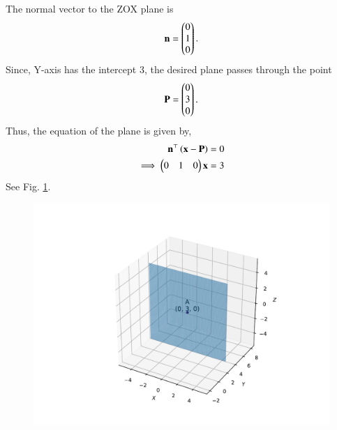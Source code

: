The normal vector to the ZOX plane is
\begin{align} 
\mathbf{n} = \begin{pmatrix}0\\1\\0\end{pmatrix}.
\end{align}
Since, Y-axis has the intercept 3, the desired plane passes through the point
\begin{align}
\mathbf{P}=\begin{pmatrix}0\\3\\0\end{pmatrix}.
\end{align}
Thus, the equation of the plane is given by,
\begin{align}
	\mathbf{n}^\top \left(\mathbf{x}-\mathbf{P}\right) &= 0\\
	\implies \begin{pmatrix}0&1&0\end{pmatrix} \mathbf{x}&= 3
\end{align}
See Fig. 
     \ref{fig:chapters/12/11/3/8/1}.
\begin{figure}[H]
  \centering
   \includegraphics[width=0.75\columnwidth]{chapters/12/11/3/8/figs/fig.pdf}
    \caption{}
     \label{fig:chapters/12/11/3/8/1}
     \end{figure}  
